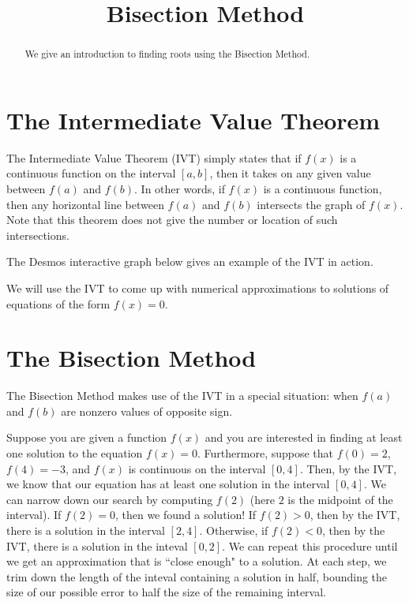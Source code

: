 \documentclass{ximera}
\title{Bisection Method}
\begin{document}
\begin{abstract}
We give an introduction to finding roots using the Bisection Method.
\end{abstract}
\maketitle

\section{The Intermediate Value Theorem}

The Intermediate Value Theorem (IVT) simply states that if $f(x)$ is a continuous function on the interval $[a,b]$, then it takes on any given value between $f(a)$ and $f(b)$. In other words, if $f(x)$ is a continuous function, then any horizontal line between $f(a)$ and $f(b)$ intersects the graph of $f(x)$. Note that this theorem does not give the number or location of such intersections.

The Desmos interactive graph below gives an example of the IVT in action.


We will use the IVT to come up with numerical approximations to solutions of equations of the form $f(x)=0$.

\section{The Bisection Method}

The Bisection Method makes use of the IVT in a special situation: when $f(a)$ and $f(b)$ are nonzero values of opposite sign.

Suppose you are given a function $f(x)$ and you are interested in finding at least one solution to the equation $f(x)=0$. Furthermore, suppose that $f(0)=2$, $f(4)=-3$, and $f(x)$ is continuous on the interval $[0,4]$. Then, by the IVT, we know that our equation has at least one solution in the interval $[0,4]$. We can narrow down our search by computing $f(2)$ (here $2$ is the midpoint of the interval). If $f(2)=0$, then we found a solution! If $f(2)>0$, then by the IVT, there is a solution in the interval $[2,4]$. Otherwise, if $f(2)<0$, then by the IVT, there is a solution in the inteval $[0,2]$. We can repeat this procedure until we get an approximation that is ``close enough" to a solution. At each step, we trim down the length of the inteval containing a solution in half, bounding the size of our possible error to half the size of the remaining interval.
\end{document}
